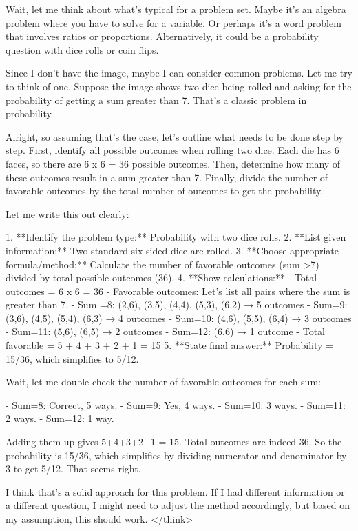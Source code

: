 \documentclass[12pt]{article}
\begin{document}
Wait, let me think about what's typical for a problem set. Maybe it's an algebra problem where you have to solve for a variable. Or perhaps it's a word problem that involves ratios or proportions. Alternatively, it could be a probability question with dice rolls or coin flips. 

Since I don't have the image, maybe I can consider common problems. Let me try to think of one. Suppose the image shows two dice being rolled and asking for the probability of getting a sum greater than 7. That's a classic problem in probability.

Alright, so assuming that's the case, let's outline what needs to be done step by step. First, identify all possible outcomes when rolling two dice. Each die has 6 faces, so there are 6 x 6 = 36 possible outcomes. Then, determine how many of these outcomes result in a sum greater than 7. Finally, divide the number of favorable outcomes by the total number of outcomes to get the probability.

Let me write this out clearly:

1. **Identify the problem type:** Probability with two dice rolls.
2. **List given information:** Two standard six-sided dice are rolled.
3. **Choose appropriate formula/method:** Calculate the number of favorable outcomes (sum >7) divided by total possible outcomes (36).
4. **Show calculations:**
   - Total outcomes = 6 x 6 = 36
   - Favorable outcomes: Let's list all pairs where the sum is greater than 7.
     - Sum =8: (2,6), (3,5), (4,4), (5,3), (6,2) → 5 outcomes
     - Sum=9: (3,6), (4,5), (5,4), (6,3) → 4 outcomes
     - Sum=10: (4,6), (5,5), (6,4) → 3 outcomes
     - Sum=11: (5,6), (6,5) → 2 outcomes
     - Sum=12: (6,6) → 1 outcome
   - Total favorable = 5 + 4 + 3 + 2 + 1 = 15
5. **State final answer:** Probability = 15/36, which simplifies to 5/12.

Wait, let me double-check the number of favorable outcomes for each sum:

- Sum=8: Correct, 5 ways.
- Sum=9: Yes, 4 ways.
- Sum=10: 3 ways.
- Sum=11: 2 ways.
- Sum=12: 1 way.

Adding them up gives 5+4+3+2+1 = 15. Total outcomes are indeed 36. So the probability is 15/36, which simplifies by dividing numerator and denominator by 3 to get 5/12. That seems right.

I think that's a solid approach for this problem. If I had different information or a different question, I might need to adjust the method accordingly, but based on my assumption, this should work.
</think>
\end{document}
